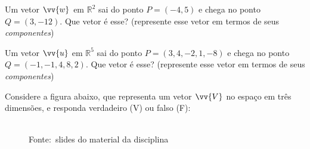 \documentclass[pdftex, brazil, 12pt, oneside, addpoints]{exam}
\newcommand{\umalinha}{\fillwithlines{0.25in}}
\newcommand{\duaslinhas}{\fillwithlines{0.50in}}
\newcommand{\treslinhas}{\fillwithlines{0.75in}}
\newcommand{\vetor}[1]{\ensuremath{\vv{#1}}}
\begin{document}
\begin{questions}

\question
Um vetor \vetor{w} em $\mathbb{R}^2$ sai do ponto $P = (-4, 5)$ e
chega no ponto $Q = (3, -12)$. Que vetor é esse? (represente esse vetor
em termos de seus \emph{componentes})

\question
Um vetor \vetor{u} em $\mathbb{R}^5$ sai do ponto $P = (3, 4, -2, 1,
-8)$ e chega no ponto $Q = (-1, -1, 4, 8, 2)$. Que vetor é esse?
(represente esse vetor em termos de seus \emph{componentes})

\question
Considere a figura abaixo, que representa um vetor \vetor{V} no espaço
em três dimensões, e responda verdadeiro (V) ou falso (F):
\begin{figure}[H]
  \begin{center}
    \\
    \footnotesize{Fonte:~slides do material da disciplina}
  \end{center}
\end{figure}
\vspace{-0.7cm}
\begin{parts}

\end{parts}
\end{questions}
\end{document}
